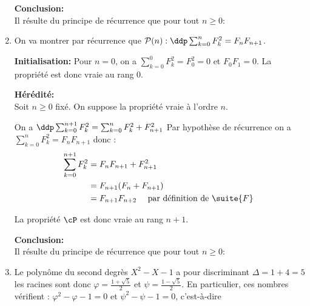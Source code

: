\documentclass[a4paper, 11pt,reqno]{article}
\begin{document}
\begin{correction}
\begin{enumerate}
\textbf{Conclusion:}\\
Il r\'esulte du principe de r\'ecurrence que pour tout $ n\geq 0$:
\begin{center}
\end{center}


\item On  va montrer par récurrence que $\mathcal{P}(n) :\ddp \sum_{k=0}^n F_{k}^2 =F_{n}F_{n+1}$. 



\textbf{Initialisation:}  Pour $n=0$, on a $\sum_{k=0}^0 F_{k}^2 = F_0^2=0$ et $F_0F_1=0$. 
La propriété est donc vraie au rang $0$. 
 
 \textbf{H\'er\'edit\'e:}\\
Soit $n\geq 0$ fix\'e. On suppose la propri\'et\'e vraie \`a l'ordre $n$. 

On a $\ddp \sum_{k=0}^{n+1} F_{k}^2 =\sum_{k=0}^{n} F_{k}^2 +F_{n+1}^2$
Par hypothèse de récurrence on a $\sum_{k=0}^{n} F_{k}^2 = F_n F_{n+1}$ donc : 
\begin{align*}
 \sum_{k=0}^{n+1} F_{k}^2 &=  F_n F_{n+1} +F_{n+1}^2\\
				&= F_{n+1} (F_n +F_{n+1}) \\
				&=   F_{n+1}F_{n+2}  \quad \text{ par définition de $\suite{F}$ }													
\end{align*}

La propriété $\cP$ est donc vraie au rang $n+1$.

\textbf{Conclusion:}\\
Il r\'esulte du principe de r\'ecurrence que pour tout $ n\geq 0$:
\begin{center}
\end{center}

\item Le polynôme du second degrès $X^2-X-1$ a pour discriminant $\Delta =1+4=5$ les racines sont donc 
$\varphi = \frac{1+\sqrt{5}}{2}$ et $\psi=\frac{1-\sqrt{5}}{2}$. 
En particulier, ces nombres vérifient : $\varphi^2 -\varphi -1 =0$ et $\psi^2 -\psi-1=0$, c'est-à-dire 

\begin{center}
\end{center}






\end{enumerate}
\end{correction}
\end{document}
